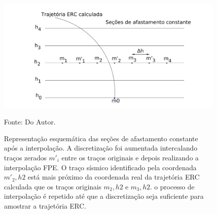 \begin{figure}
\caption{Representação esquemática das seções de afastamento constante após a interpolação. A discretização foi aumentada
intercalando traços zerados $m'_i$ entre os traços originais e depois realizando a interpolação FPE. O traço sísmico 
identificado pela coordenada $m'_2, h2$ está mais próximo da coordenada real da trajetória ERC calculada que os traços 
originais $m_2, h2$ e $m_3, h2$. o processo de interpolação é repetido até que a discretização seja suficiente para amostrar a 
trajetória ERC.}
\begin{center}
\includegraphics[scale=0.15]{images/interpolacao.png}
\vspace{-0.3cm}
\end{center}
\begin{center}
 Fonte: Do Autor.
\end{center}
\label{fig:3.2}
\end{figure}

